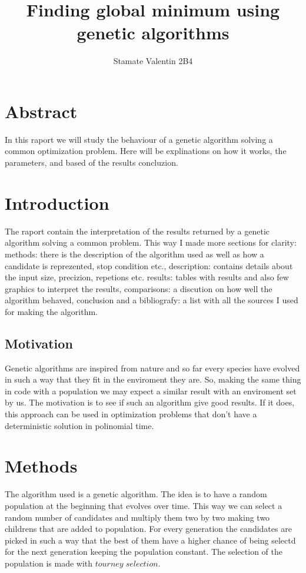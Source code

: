\documentclass[12pt,leqno]{article}
\title{Finding global minimum using genetic algorithms}
\author{Stamate Valentin 2B4}
\begin{document}
\maketitle

\section*{Abstract}

  In this raport we will study the behaviour of a genetic algorithm solving a common optimization problem. Here will be explinations on how it works, the parameters, and based of the results concluzion.

\section{Introduction}
  The raport contain the interpretation of the results returned by a genetic algorithm solving a common problem. This way I made more sections for clarity:
  methods: there is the description of the algorithm used as well as how a candidate is reprezented, stop condition etc., description: contains details about the input size, precizion, repetions etc.
  results: tables with results and also few graphics to interpret the results, comparisons: a discution on how well the algorithm behaved, conclusion and a bibliografy: a list with all the sources I used for making the algorithm.
  

\subsection{Motivation}
  
  Genetic algorithms are inspired from nature and so far every species have evolved in such a way that they fit in the enviroment they are. So, making the same thing in code with a population we may expect a similar result with an enviroment set by us.
  The motivation is to see if such an algorithm give good results. If it does, this approach can be used in optimization problems that don't have a deterministic solution in polinomial time.

\section{Methods}
  
  The algorithm used is a genetic algorithm. The idea is to have a random population at the beginning that evolves over time. This way we can select a random number of candidates and multiply them two by two making two childrens that are added to population.
  For every generation the candidates are picked in such a way that the best of them have a higher chance of being selectd for the next generation keeping the population constant. The selection of the population is made with $ tourney \; selection $. 
  
\end{document}
